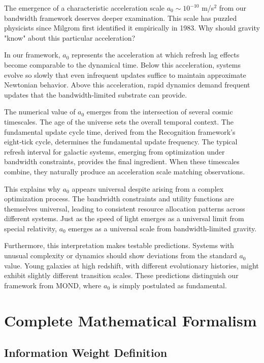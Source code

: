 \documentclass[twocolumn,prd,amsmath,amssymb,aps,superscriptaddress,nofootinbib]{revtex4-2}
\begin{document}
The emergence of a characteristic acceleration scale $a_0 \sim 10^{-10}$ m/s$^2$ from our bandwidth framework deserves deeper examination. This scale has puzzled physicists since Milgrom first identified it empirically in 1983. Why should gravity "know" about this particular acceleration?

In our framework, $a_0$ represents the acceleration at which refresh lag effects become comparable to the dynamical time. Below this acceleration, systems evolve so slowly that even infrequent updates suffice to maintain approximate Newtonian behavior. Above this acceleration, rapid dynamics demand frequent updates that the bandwidth-limited substrate can provide.

The numerical value of $a_0$ emerges from the intersection of several cosmic timescales. The age of the universe sets the overall temporal context. The fundamental update cycle time, derived from the Recognition framework's eight‑tick cycle, determines the fundamental update frequency. The typical refresh interval for galactic systems, emerging from optimization under bandwidth constraints, provides the final ingredient. When these timescales combine, they naturally produce an acceleration scale matching observations.

This explains why $a_0$ appears universal despite arising from a complex optimization process. The bandwidth constraints and utility functions are themselves universal, leading to consistent resource allocation patterns across different systems. Just as the speed of light emerges as a universal limit from special relativity, $a_0$ emerges as a universal scale from bandwidth-limited gravity.

Furthermore, this interpretation makes testable predictions. Systems with unusual complexity or dynamics should show deviations from the standard $a_0$ value. Young galaxies at high redshift, with different evolutionary histories, might exhibit slightly different transition scales. These predictions distinguish our framework from MOND, where $a_0$ is simply postulated as fundamental.

\section{Complete Mathematical Formalism}
\label{sec:formalism}

\subsection{Information Weight Definition}
\end{document}
